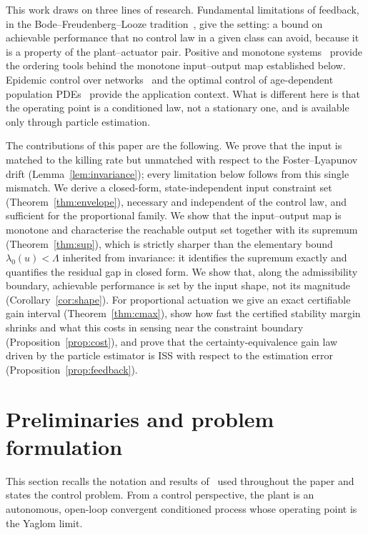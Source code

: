 \documentclass[letterpaper, 10pt, conference]{ieeeconf}
\newcommand{\Lbar}{\Lambda}
\newcommand{\rev}[1]{#1}
\newcommand{\pl}[1]{#1}
\newcommand{\ed}[1]{#1}
\begin{document}
\pl{This work draws on three lines of research.} Fundamental limitations of
feedback, in the Bode--Freudenberg--Looze
tradition~\cite{bode,freudenberg,sbg,stein}, \pl{give the setting}: a bound on
achievable performance that no control law \rev{in a given class} can \pl{avoid}, because it is a
property of the plant--actuator pair. Positive and monotone
systems~\cite{farina,angeli,rantzer} \pl{provide the ordering tools} behind the
monotone input--output map established below. Epidemic control over
networks~\cite{preciado,nowzari,pare} and the optimal control of age-dependent
population PDEs~\cite{anita,webb,lenhart} \pl{provide the application context.
What is different here is} that the operating point is a \pl{conditioned}
law, not a stationary one, and is available only through particle estimation.


\pl{The contributions of this paper are the following.} We prove that the input is matched to the killing rate
but unmatched with respect to the Foster--Lyapunov drift
(Lemma~\ref{lem:invariance}); every limitation below follows from this single
mismatch. We derive a closed-form, state-independent input constraint set
(Theorem~\ref{thm:envelope}), necessary and independent of the control law, and
sufficient for the proportional family. We show that the input--output map is
monotone and characterise the reachable output set together with its supremum
(Theorem~\ref{thm:sup}), \rev{which is strictly sharper than the elementary
bound $\lambda_0(u)<\Lbar$ inherited from invariance: it identifies the
supremum exactly and quantifies the residual gap in closed form}. We show that\rev{, along the
admissibility boundary,} achievable performance is set by
the input \pl{shape}, not its magnitude (Corollary~\ref{cor:shape}). For
proportional actuation we give an exact certifiable gain interval
(Theorem~\ref{thm:cmax}), \pl{show how fast the certified stability margin
shrinks and what this costs in sensing} near the constraint boundary
(Proposition~\ref{prop:cost}), and prove that the certainty-equivalence gain law
driven by the particle estimator is ISS with respect to the estimation error
(Proposition~\ref{prop:feedback}).






\section{Preliminaries and problem formulation}
\label{sec:plant}
This section recalls the notation and results of~\cite{companion} used
throughout the paper and states the control problem. From a control
perspective, the plant is an autonomous, \ed{open-loop convergent} conditioned
process whose operating point is the Yaglom limit.
\end{document}
